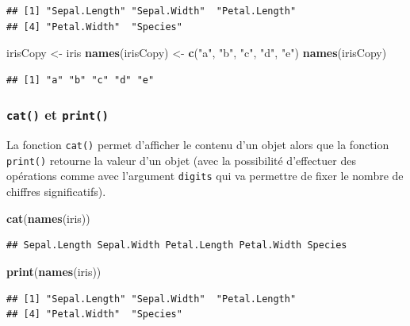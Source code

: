 \documentclass[twoside,symmetric]{book}
\newenvironment{Shaded}{}{}
\newcommand{\KeywordTok}[1]{\textbf{#1}}
\newcommand{\NormalTok}[1]{#1}
\newcommand{\StringTok}[1]{#1}
\begin{document}
\begin{verbatim}
## [1] "Sepal.Length" "Sepal.Width"  "Petal.Length"
## [4] "Petal.Width"  "Species"
\end{verbatim}

\begin{Shaded}
\begin{Highlighting}[]
\NormalTok{irisCopy <-}\StringTok{ }\NormalTok{iris}
\KeywordTok{names}\NormalTok{(irisCopy) <-}\StringTok{ }\KeywordTok{c}\NormalTok{(}\StringTok{"a"}\NormalTok{, }\StringTok{"b"}\NormalTok{, }\StringTok{"c"}\NormalTok{, }\StringTok{"d"}\NormalTok{, }\StringTok{"e"}\NormalTok{)}
\KeywordTok{names}\NormalTok{(irisCopy)}
\end{Highlighting}
\end{Shaded}

\begin{verbatim}
## [1] "a" "b" "c" "d" "e"
\end{verbatim}

\hypertarget{l015print}{%
\subsubsection{\texorpdfstring{\texttt{cat()} et \texttt{print()}}{cat() et print()}}\label{l015print}}

La fonction \texttt{cat()} permet d'afficher le contenu d'un objet alors que la fonction \texttt{print()} retourne la valeur d'un objet (avec la possibilité d'effectuer des opérations comme avec l'argument \texttt{digits} qui va permettre de fixer le nombre de chiffres significatifs).

\begin{Shaded}
\begin{Highlighting}[]
\KeywordTok{cat}\NormalTok{(}\KeywordTok{names}\NormalTok{(iris))}
\end{Highlighting}
\end{Shaded}

\begin{verbatim}
## Sepal.Length Sepal.Width Petal.Length Petal.Width Species
\end{verbatim}

\begin{Shaded}
\begin{Highlighting}[]
\KeywordTok{print}\NormalTok{(}\KeywordTok{names}\NormalTok{(iris))}
\end{Highlighting}
\end{Shaded}

\begin{verbatim}
## [1] "Sepal.Length" "Sepal.Width"  "Petal.Length"
## [4] "Petal.Width"  "Species"
\end{verbatim}
\end{document}
